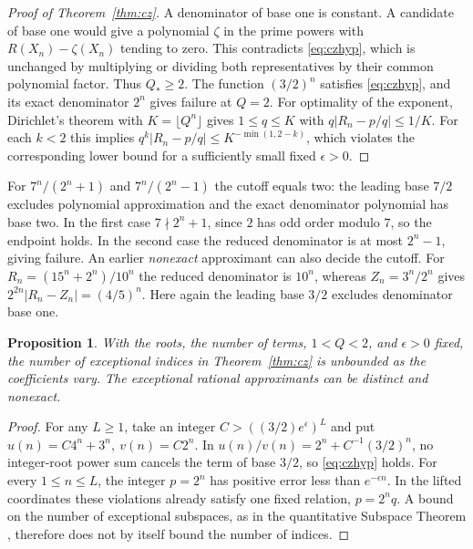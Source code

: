 \documentclass[11pt,a4paper,reqno]{amsart}
\newtheorem{proposition}[theorem]{Proposition}
\theoremstyle{definition}
\theoremstyle{remark}
\numberwithin{equation}{section}
\begin{document}
\begin{proof}[Proof of Theorem~\ref{thm:cz}]
A denominator of base one is constant. A candidate of base one would give a polynomial \(\zeta\) in the prime powers with \(R(X_n)-\zeta(X_n)\) tending to zero. This contradicts \eqref{eq:czhyp}, which is unchanged by multiplying or dividing both representatives by their common polynomial factor. Thus \(Q_*\ge2\). The function \((3/2)^n\) satisfies \eqref{eq:czhyp}, and its exact denominator \(2^n\) gives failure at \(Q=2\).
For optimality of the exponent, Dirichlet's theorem with \(K=\lfloor Q^n\rfloor\) gives \(1\le q\le K\) with \(q|R_n-p/q|\le1/K\). For each \(k<2\) this implies
\(q^k|R_n-p/q|\le K^{-\min(1,2-k)}\),
which violates the corresponding lower bound for a sufficiently small fixed \(\epsilon>0\).
\end{proof}

For \(7^n/(2^n+1)\) and \(7^n/(2^n-1)\) the cutoff equals two: the leading base \(7/2\) excludes polynomial approximation and the exact denominator polynomial has base two. In the first case \(7\nmid 2^n+1\), since \(2\) has odd order modulo \(7\), so the endpoint holds. In the second case the reduced denominator is at most \(2^n-1\), giving failure. An earlier \emph{nonexact} approximant can also decide the cutoff. For \(R_n=(15^n+2^n)/10^n\) the reduced denominator is \(10^n\), whereas \(Z_n=3^n/2^n\) gives \(2^{2n}|R_n-Z_n|=(4/5)^n\). Here again the leading base \(3/2\) excludes denominator base one.

\begin{proposition}\label{prop:exceptions}
With the roots, the number of terms, \(1<Q<2\), and \(\epsilon>0\) fixed, the number of exceptional indices in Theorem~\ref{thm:cz} is unbounded as the coefficients vary. The exceptional rational approximants can be distinct and nonexact.
\end{proposition}
\begin{proof}
For any \(L\ge1\), take an integer \(C>((3/2)e^\epsilon)^L\) and put \(u(n)=C4^n+3^n,\ v(n)=C2^n\). In \(u(n)/v(n)=2^n+C^{-1}(3/2)^n\), no integer-root power sum cancels the term of base \(3/2\), so \eqref{eq:czhyp} holds. For every \(1\le n\le L\), the integer \(p=2^n\) has positive error less than \(e^{-\epsilon n}\). In the lifted coordinates these violations already satisfy one fixed relation, \(p=2^nq\). A bound on the number of exceptional subspaces, as in the quantitative Subspace Theorem \cite{EF}, therefore does not by itself bound the number of indices.
\end{proof}
\end{document}
